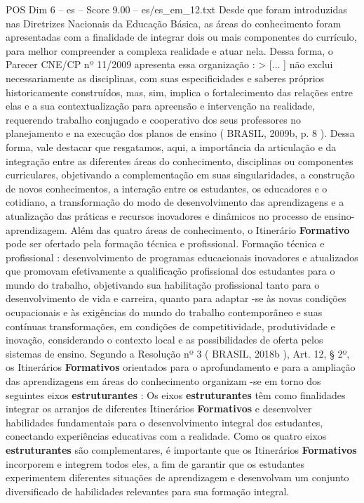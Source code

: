 \begin{textsample}{POS Dim 6 – es – Score 9.00 – es/es\_em\_12.txt}
Desde que foram introduzidas nas Diretrizes Nacionais da Educação Básica, as áreas do conhecimento foram apresentadas com a finalidade de integrar dois ou mais componentes do currículo, para melhor compreender a complexa realidade e atuar nela.
Dessa forma, o Parecer CNE/CP nº 11/2009 apresenta essa organização : > [... ] não exclui necessariamente as disciplinas, com suas especificidades e saberes próprios historicamente construídos, mas, sim, implica o fortalecimento das relações entre elas e a sua contextualização para apreensão e intervenção na realidade, requerendo trabalho conjugado e cooperativo dos seus professores no planejamento e na execução dos planos de ensino ( BRASIL, 2009b, p. 8 ).
Dessa forma, vale destacar que resgatamos, aqui, a importância da articulação e da integração entre as diferentes áreas do conhecimento, disciplinas ou componentes curriculares, objetivando a complementação em suas singularidades, a construção de novos conhecimentos, a interação entre os estudantes, os educadores e o cotidiano, a transformação do modo de desenvolvimento das aprendizagens e a atualização das práticas e recursos inovadores e dinâmicos no processo de ensino-aprendizagem.
Além das quatro áreas de conhecimento, o Itinerário \textbf{Formativo} pode ser ofertado pela formação técnica e profissional.
Formação técnica e profissional : desenvolvimento de programas educacionais inovadores e atualizados que promovam efetivamente a qualificação profissional dos estudantes para o mundo do trabalho, objetivando sua habilitação profissional tanto para o desenvolvimento de vida e carreira, quanto para adaptar -se às novas condições ocupacionais e às exigências do mundo do trabalho contemporâneo e suas contínuas transformações, em condições de competitividade, produtividade e inovação, considerando o contexto local e as possibilidades de oferta pelos sistemas de ensino.
Segundo a Resolução nº 3 ( BRASIL, 2018b ), Art. 12, § 2º, os Itinerários \textbf{Formativos} orientados para o aprofundamento e para a ampliação das aprendizagens em áreas do conhecimento organizam -se em torno dos seguintes eixos \textbf{estruturantes} : Os eixos \textbf{estruturantes} têm como finalidades integrar os arranjos de diferentes Itinerários \textbf{Formativos} e desenvolver habilidades fundamentais para o desenvolvimento integral dos estudantes, conectando experiências educativas com a realidade.
Como os quatro eixos \textbf{estruturantes} são complementares, é importante que os Itinerários \textbf{Formativos} incorporem e integrem todos eles, a fim de garantir que os estudantes experimentem diferentes situações de aprendizagem e desenvolvam um conjunto diversificado de habilidades relevantes para sua formação integral.

\end{textsample}
